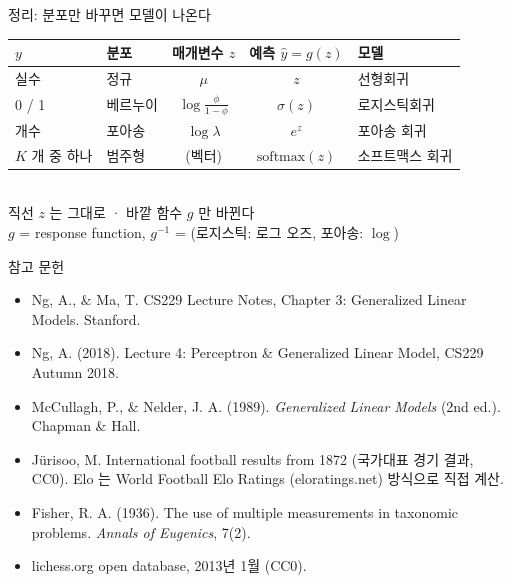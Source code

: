 \documentclass[aspectratio=169,11pt,t]{beamer}
\newcommand{\paperlink}[1]{\href{#1}{\textcolor{ksablue}{\faLink}}}
\begin{document}
\begin{frame}{정리: 분포만 바꾸면 모델이 나온다}
\vfill
\centering
\renewcommand{\arraystretch}{1.7}
{\large\begin{tabular}{l|l|c|c|l}
$y$ & 분포 & 매개변수 $z$ & 예측 $\hat y = g(z)$ & 모델\\ \hline
실수 & 정규 & $\mu$ & $z$ & 선형회귀\\
0 / 1 & 베르누이 & $\log\frac{\phi}{1-\phi}$ & $\sigma(z)$ & 로지스틱회귀\\
개수 & 포아송 & $\log\lambda$ & $e^{z}$ & 포아송 회귀\\
$K$ 개 중 하나 & 범주형 & (벡터) & $\mathrm{softmax}(z)$ & 소프트맥스 회귀
\end{tabular}}\\[1.0em]
{\large 직선 $z$ 는 그대로 \;·\; 바깥 함수 $g$ 만 바뀐다}\\[0.3em]
{\small $g$ = response function, \;$g^{-1}$ =  (로지스틱: 로그 오즈, 포아송: $\log$)}
\vfill
{}
\end{frame}

\begin{frame}{참고 문헌}
\vfill
\small
\begin{itemize}
\item Ng, A., \& Ma, T. CS229 Lecture Notes, Chapter 3: Generalized Linear Models. Stanford. \paperlink{https://cs229.stanford.edu/main_notes.pdf}
\item Ng, A. (2018). Lecture 4: Perceptron \& Generalized Linear Model, CS229 Autumn 2018. \paperlink{https://www.youtube.com/watch?v=iZTeva0WSTQ}
\item McCullagh, P., \& Nelder, J. A. (1989). \textit{Generalized Linear Models} (2nd ed.). Chapman \& Hall.
\item Jürisoo, M. International football results from 1872 (국가대표 경기 결과, CC0). Elo 는 World Football Elo Ratings (eloratings.net) 방식으로 직접 계산. \paperlink{https://github.com/martj42/international_results}
\item Fisher, R. A. (1936). The use of multiple measurements in taxonomic problems. \textit{Annals of Eugenics}, 7(2).
\item lichess.org open database, 2013년 1월 (CC0). \paperlink{https://database.lichess.org}
\end{itemize}
\vfill
{}
\end{frame}
\end{document}
